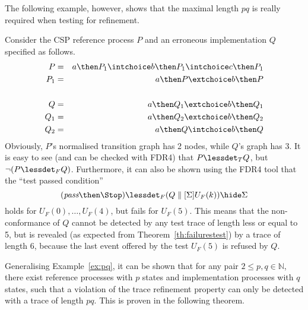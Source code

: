 The following example, however, shows that the maximal length $pq$ is really required 
when testing for refinement.
\begin{example}\label{ex:pq}
Consider the CSP reference process $P$ and an erroneous implementation $Q$ specified
as follows.
\begin{eqnarray*}
P & = & a \then P_1 \intchoice b \then P_1 \intchoice c \then P_1
\\
P_1 & = & a \then P \extchoice b\then P
\\ & &  \\
Q & = & a\then Q_1 \extchoice b\then Q_1
\\
Q_1 & = & a\then Q_2 \extchoice b\then Q_2
\\
Q_2 & = & a\then Q \intchoice b\then Q
\end{eqnarray*}
Obviously, $P$'s normalised transition graph has 2 nodes, 
while $Q$'s graph has 3.
It is easy to see (and can be checked with FDR4) that $P\lessdet_T Q$, but 
$\neg(P\lessdet_F Q)$. Furthermore, it can also be shown using the FDR4 tool that
the ``test passed condition'' 
\[
(\epass\then\Stop) \lessdet_F (Q\parallel[\Sigma] U_F(k))\hide \Sigma
\]
holds for $U_F(0),\dots,U_F(4)$, but fails for $U_F(5)$. This means that the
non-conformance of $Q$ cannot be detected by any test trace of length 
less or equal to 5, but is revealed (as expected from Theorem~\ref{th:failurestest})
by a trace of length 6, because the last event offered by the test $U_F(5)$ is 
refused by $Q$.
\xbox
\end{example}
%
Generalising Example~\ref{ex:pq}, it can be shown that for any pair 
$2\le p,q \in\mathbb{N}$,  
there exist reference processes with $p$ states
and implementation processes with $q$ states, such that 
a violation of the trace refinement property
can only be detected with a trace of length $pq$. This is proven in the following 
theorem.

